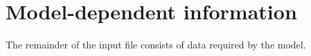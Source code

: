 
\section{Model-dependent information}\label{model-info}
The remainder of the input file consists of data required by the model. 
